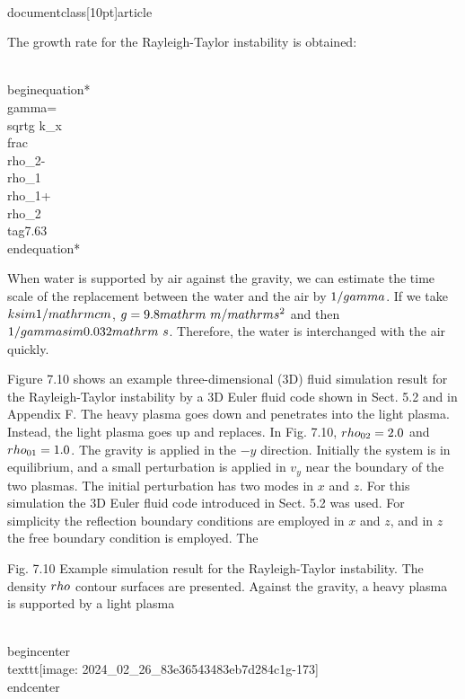 \\documentclass[10pt]{article}
\begin{document}
{{{{The growth rate for the Rayleigh-Taylor instability is obtained:


\\begin{equation*}
\\gamma=\\sqrt{g k_{x} \\frac{\\rho_{2}-\\rho_{1}}{\\rho_{1}+\\rho_{2}}} \\tag{7.63}
\\end{equation*}


When water is supported by air against the gravity, we can estimate the time scale of the replacement between the water and the air by $1 / \\gamma$. If we take $k \\sim 1 / \\mathrm{cm}$, $g=9.8 \\mathrm{~m} / \\mathrm{s}^{2}$ and then $1 / \\gamma \\sim 0.032 \\mathrm{~s}$. Therefore, the water is interchanged with the air quickly.

Figure 7.10 shows an example three-dimensional (3D) fluid simulation result for the Rayleigh-Taylor instability by a 3D Euler fluid code shown in Sect. 5.2 and in Appendix F. The heavy plasma goes down and penetrates into the light plasma. Instead, the light plasma goes up and replaces. In Fig. 7.10, $\\rho_{02}=2.0$ and $\\rho_{01}=1.0$. The gravity is applied in the $-y$ direction. Initially the system is in equilibrium, and a small perturbation is applied in $v_{y}$ near the boundary of the two plasmas. The initial perturbation has two modes in $x$ and $z$. For this simulation the 3D Euler fluid code introduced in Sect. 5.2 was used. For simplicity the reflection boundary conditions are employed in $x$ and $z$, and in $z$ the free boundary condition is employed. The

Fig. 7.10 Example simulation result for the Rayleigh-Taylor instability. The density $\\rho$ contour surfaces are presented. Against the gravity, a heavy plasma is supported by a light plasma

\\begin{center}
\\texttt{[image: 2024\_02\_26\_83e36543483eb7d284c1g-173]}
\\end{center}

}}}}
\end{document}
